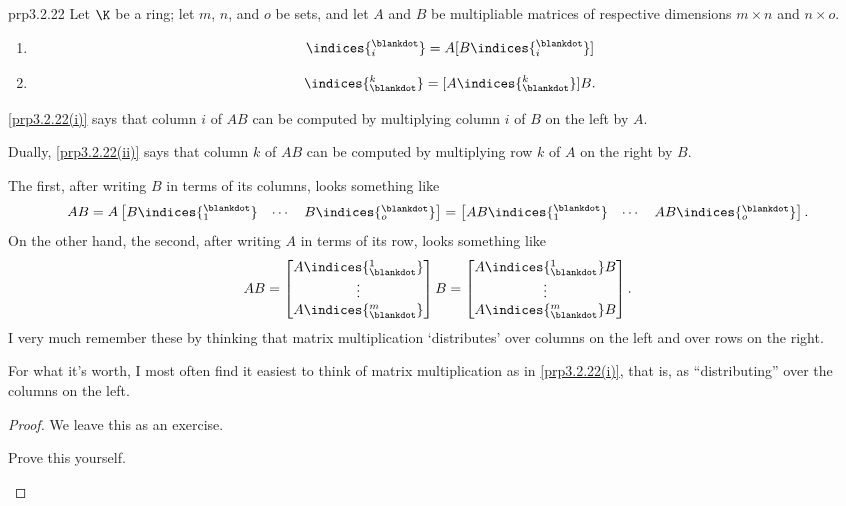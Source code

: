 \begin{prp}{}{prp3.2.22}
	Let $\K$ be a ring; let $m$, $n$, and $o$ be sets, and let $A$ and $B$ be multipliable matrices of respective dimensions $m\times n$ and $n\times o$.
	\begin{enumerate}
		\item \label{prp3.2.22(i)}
		\begin{equation}
			[AB]\indices{^{\blankdot}_i}=A[B\indices{^{\blankdot}_i}]
		\end{equation}
		\item \label{prp3.2.22(ii)}
		\begin{equation}
			[AB]\indices{^k_{\blankdot}}=[A\indices{^k_{\blankdot}}]B.
		\end{equation}
	\end{enumerate}
	\begin{rmk}
		\cref{prp3.2.22(i)} says that column $i$ of $AB$ can be computed by multiplying column $i$ of $B$ on the left by $A$.
		
		Dually, \cref{prp3.2.22(ii)} says that column $k$ of $AB$ can be computed by multiplying row $k$ of $A$ on the right by $B$.
	\end{rmk}
	\begin{rmk}
		The first, after writing $B$ in terms of its columns, looks something like
		\begin{equation}
			AB=A\begin{bmatrix}B\indices{^{\blankdot}_1} & \cdots & B\indices{^{\blankdot}_o}\end{bmatrix}=\begin{bmatrix}AB\indices{^{\blankdot}_1} & \cdots & AB\indices{^{\blankdot}_o}\end{bmatrix}.
		\end{equation}
		On the other hand, the second, after writing $A$ in terms of its row, looks something like
		\begin{equation}
			AB=\begin{bmatrix}A\indices{^1_{\blankdot}} \\ \vdots \\ A\indices{^m_{\blankdot}}\end{bmatrix}B=\begin{bmatrix}A\indices{^1_{\blankdot}}B \\ \vdots \\ A\indices{^m_{\blankdot}}B\end{bmatrix}.
		\end{equation}
		I very much remember these by thinking that matrix multiplication `distributes' over columns on the left and over rows on the right.
	\end{rmk}
	\begin{rmk}
		For what it's worth, I most often find it easiest to think of matrix multiplication as in \cref{prp3.2.22(i)}, that is, as ``distributing'' over the columns on the left.
	\end{rmk}
	\begin{proof}
		We leave this as an exercise.
		\begin{exr}[breakable=false]{}{}
			Prove this yourself.
		\end{exr}
	\end{proof}
\end{prp}
